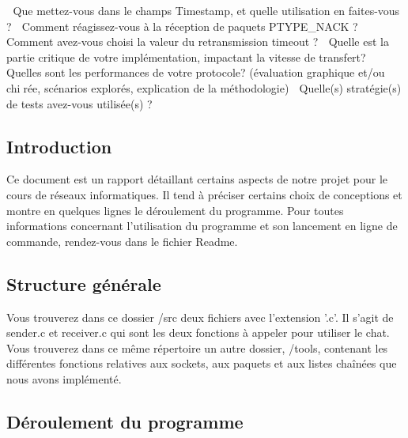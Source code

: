 􏰁 Que mettez-vous dans le champs Timestamp, et quelle utilisation en faites-vous ?
􏰁 Comment réagissez-vous à la réception de paquets PTYPE_NACK ?
􏰁 Comment avez-vous choisi la valeur du retransmission timeout ?
􏰁 Quelle est la partie critique de votre implémentation, impactant la vitesse de transfert?
􏰁 Quelles sont les performances de votre protocole? (évaluation graphique et/ou chi􏰂rée, scénarios explorés, explication de la méthodologie)
􏰁 Quelle(s) stratégie(s) de tests avez-vous utilisée(s) ?

\subsection{Introduction}
Ce document est un rapport détaillant certains aspects de notre projet pour le cours de réseaux informatiques. Il tend
à préciser certains choix de conceptions et montre en quelques lignes le déroulement du programme. Pour toutes informations
concernant l'utilisation du programme et son lancement en ligne de commande, rendez-vous dans le fichier Readme.

\subsection{Structure générale}
Vous trouverez dans ce dossier /src deux fichiers avec l'extension '.c'. Il s'agit de sender.c et receiver.c qui sont les deux fonctions
à appeler pour utiliser le chat. Vous trouverez dans ce même répertoire un autre dossier, /tools, contenant les différentes
fonctions relatives aux sockets, aux paquets et aux listes chaînées que nous avons implémenté.

\subsection{Déroulement du programme}

